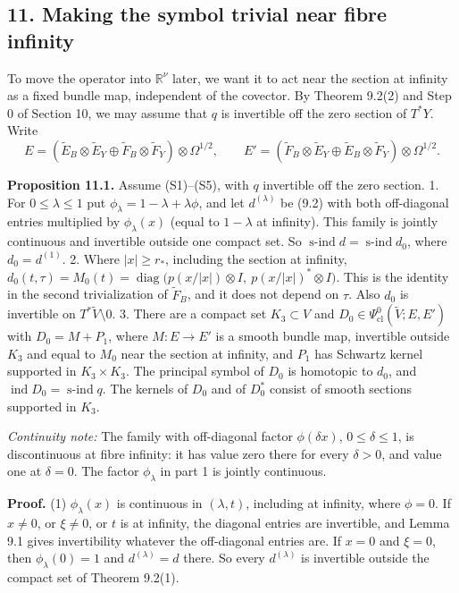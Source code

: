 \documentclass[
  11pt,
]{article}
\begin{document}
\subsection{11. Making the symbol trivial near fibre
infinity}\label{making-the-symbol-trivial-near-fibre-infinity}

To move the operator into \(\mathbb R^\nu\) later, we want it to act
near the section at infinity as a fixed bundle map, independent of the
covector. By Theorem 9.2(2) and Step 0 of Section 10, we may assume that
\(q\) is invertible off the zero section of \(T^*Y\). Write \[
E=(\tilde E_B\otimes\tilde E_Y\oplus\tilde F_B\otimes\tilde F_Y)\otimes\Omega^{1/2},\qquad
E'=(\tilde F_B\otimes\tilde E_Y\oplus\tilde E_B\otimes\tilde F_Y)\otimes\Omega^{1/2}.
\]

\textbf{Proposition 11.1.} Assume (S1)--(S5), with \(q\) invertible off
the zero section. 1. For \(0\le\lambda\le1\) put
\(\phi_\lambda=1-\lambda+\lambda\phi\), and let \(d^{(\lambda)}\) be
(9.2) with both off-diagonal entries multiplied by \(\phi_\lambda(x)\)
(equal to \(1-\lambda\) at infinity). This family is jointly continuous
and invertible outside one compact set. So
\(\operatorname{s-ind}d=\operatorname{s-ind}d_0\), where
\(d_0=d^{(1)}\). 2. Where \(|x|\ge r_*\), including the section at
infinity,
\(d_0(t,\tau)=M_0(t)=\operatorname{diag}\bigl(p(x/|x|)\otimes I,\ p(x/|x|)^*\otimes I\bigr)\).
This is the identity in the second trivialization of \(\tilde F_B\), and
it does not depend on \(\tau\). Also \(d_0\) is invertible on
\(T^*\tilde V\setminus0\). 3. There are a compact set \(K_3\subset V\)
and \(D_0\in\Psi^0_{\mathrm{cl}}(\tilde V;E,E')\) with \(D_0=M+P_1\),
where \(M:E\to E'\) is a smooth bundle map, invertible outside \(K_3\)
and equal to \(M_0\) near the section at infinity, and \(P_1\) has
Schwartz kernel supported in \(K_3\times K_3\). The principal symbol of
\(D_0\) is homotopic to \(d_0\), and
\(\operatorname{ind}D_0=\operatorname{s-ind}q\). The kernels of \(D_0\)
and of \(D_0^*\) consist of smooth sections supported in \(K_3\).

\emph{Continuity note:} The family with off-diagonal factor
\(\phi(\delta x)\), \(0\le\delta\le1\), is discontinuous at fibre
infinity: it has value zero there for every \(\delta>0\), and value one
at \(\delta=0\). The factor \(\phi_\lambda\) in part 1 is jointly
continuous.

\textbf{Proof.} (1) \(\phi_\lambda(x)\) is continuous in
\((\lambda,t)\), including at infinity, where \(\phi=0\). If \(x\ne0\),
or \(\xi\ne0\), or \(t\) is at infinity, the diagonal entries are
invertible, and Lemma 9.1 gives invertibility whatever the off-diagonal
entries are. If \(x=0\) and \(\xi=0\), then \(\phi_\lambda(0)=1\) and
\(d^{(\lambda)}=d\) there. So every \(d^{(\lambda)}\) is invertible
outside the compact set of Theorem 9.2(1).
\end{document}
